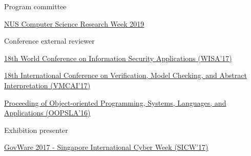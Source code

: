 

\begin{cventries}
  \cventry
    {Program committee} %
    {}
    {}
    {}
    {
      \begin{cvitems} %
        \item \href{http://researchweek.comp.nus.edu.sg/}{NUS Computer Science Research Week 2019}
      \end{cvitems}
    }

  \cventry
    {Conference external reviewer} %
    {}
    {}
    {}
    {
      \begin{cvitems} %
        \item \href{http://www.wisa.or.kr/}{18th World Conference on Information Security Applications (WISA'17)}
        \item \href{http://conf.researchr.org/home/VMCAI-2017}{18th International Conference on Verification, Model Checking, and Abstract Interpretation (VMCAI'17)}
        \item \href{http://2016.splashcon.org/track/splash-2016-oopsla}{Proceeding of Object-oriented Programming, Systems, Languages, and Applications (OOPSLA'16)}
      \end{cvitems}
    }
    \cventry
    {Exhibition presenter} %
    {}
    {}
    {}
    {
      \begin{cvitems} %
        \item \href{https://www.sicw.sg/2017/}{GovWare 2017 - Singapore International Cyber Week (SICW'17)}
      \end{cvitems}
    }
    
\end{cventries}



